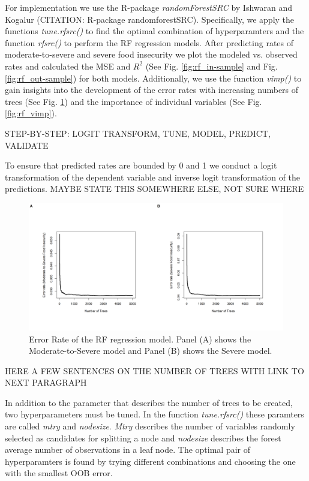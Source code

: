 \documentclass{article}
\begin{document}
For implementation we use the R-package \textit{randomForestSRC} by Ishwaran and Kogalur (CITATION: R-package randomforestSRC). Specifically, we apply the functions \textit{tune.rfsrc()} to find the optimal combination of hyperparamters and the function \textit{rfsrc()} to perform the RF regression models. After predicting rates of moderate-to-severe and severe food insecurity we plot the modeled vs. observed rates and calculated the MSE and ${R}^2$ (See Fig. \ref{fig:rf_in-sample} and Fig. \ref{fig:rf_out-sample}) for both models. Additionally, we use the function \textit{vimp()} to gain insights into the development of the error rates with increasing numbers of trees (See Fig. \ref{fig:rf_error}) and the importance of individual variables (See Fig. \ref{fig:rf_vimp}).



STEP-BY-STEP: LOGIT TRANSFORM, TUNE, MODEL, PREDICT, VALIDATE


To ensure that predicted rates are bounded by 0 and 1 we conduct a logit transformation of the dependent variable and inverse logit transformation of the predictions. 
MAYBE STATE THIS SOMEWHERE ELSE, NOT SURE WHERE

\begin{figure}[H]
  \centering
  \includegraphics[width=\linewidth]{img/model/error_rf.png}
  \caption{Error Rate of the RF regression model. Panel (A) shows the Moderate-to-Severe model and Panel (B) shows the Severe model.}
  \label{fig:rf_error}
\end{figure}

HERE A FEW SENTENCES ON THE NUMBER OF TREES WITH LINK TO NEXT PARAGRAPH

In addition to the parameter that describes the number of trees to be created, two hyperparameters must be tuned. In the function \textit{tune.rfsrc()} these paramters are called \textit{mtry} and \textit{nodesize}. \textit{Mtry} describes the number of variables randomly selected as candidates for splitting a node and \textit{nodesize} describes the forest average number of observations in a leaf node. The optimal pair of hyperparamters is found by trying different combinations and choosing the one with the smallest OOB error.
\end{document}
